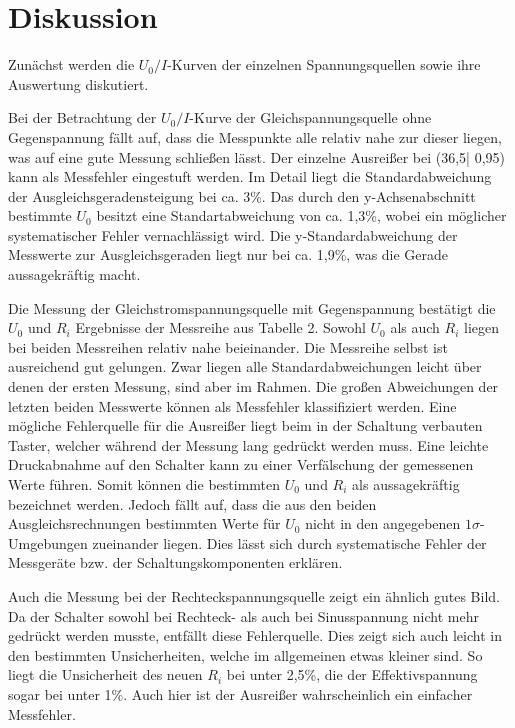 \section{Diskussion}
\label{sec:Diskussion}


Zunächst werden die $U_0/I $-Kurven der einzelnen Spannungsquellen sowie ihre Auswertung diskutiert.

Bei der Betrachtung der $U_0 /I$-Kurve der Gleichspannungsquelle ohne Gegenspannung
fällt auf, dass die Messpunkte alle relativ nahe zur dieser liegen, was auf eine gute
Messung schließen lässt. Der einzelne Ausreißer bei (36,5| 0,95) kann als Messfehler
eingestuft werden.
 Im Detail liegt die Standardabweichung der Ausgleichsgeradensteigung bei ca. 3\%. Das durch den
 y-Achsenabschnitt bestimmte $U_0$ besitzt eine Standartabweichung von ca. 1,3\%, wobei ein möglicher
 systematischer Fehler vernachlässigt wird.
 Die y-Standardabweichung der Messwerte zur Ausgleichsgeraden liegt nur bei ca. 1,9\%,
  was die Gerade aussagekräftig macht.


Die Messung der Gleichstromspannungsquelle mit Gegenspannung bestätigt die $U_0$ und $R_i$ Ergebnisse
der Messreihe aus Tabelle 2. Sowohl $U_0$ als auch $R_i$ liegen bei beiden Messreihen
 relativ nahe beieinander.  Die Messreihe selbst ist ausreichend gut gelungen.
 Zwar liegen alle Standardabweichungen leicht über denen der ersten Messung,
 sind aber im Rahmen.
 Die großen Abweichungen der letzten beiden Messwerte können als Messfehler klassifiziert werden.
 Eine mögliche Fehlerquelle für die Ausreißer liegt beim in der Schaltung verbauten Taster,
  welcher während der Messung lang gedrückt werden muss. Eine leichte Druckabnahme auf den Schalter
  kann zu einer Verfälschung der gemessenen Werte führen.
 Somit können die bestimmten $U_0$ und $R_i$ als aussagekräftig bezeichnet werden.
 Jedoch fällt auf, dass die aus den beiden Ausgleichsrechnungen bestimmten Werte für $U_0$
 nicht in den angegebenen $1\sigma$-Umgebungen zueinander liegen.
 Dies lässt sich durch systematische Fehler der Messgeräte bzw. der Schaltungskomponenten erklären.

Auch die Messung bei der Rechteckspannungsquelle zeigt ein ähnlich gutes Bild.
 Da  der Schalter sowohl bei Rechteck- als auch bei Sinusspannung nicht mehr gedrückt werden musste,
entfällt diese Fehlerquelle. Dies zeigt sich auch leicht in den bestimmten Unsicherheiten,
welche im allgemeinen etwas kleiner sind. So liegt die Unsicherheit des neuen $R_i$ bei
unter 2,5\%, die der Effektivspannung sogar bei unter 1\%. Auch hier ist der Ausreißer wahrscheinlich
ein einfacher Messfehler.

